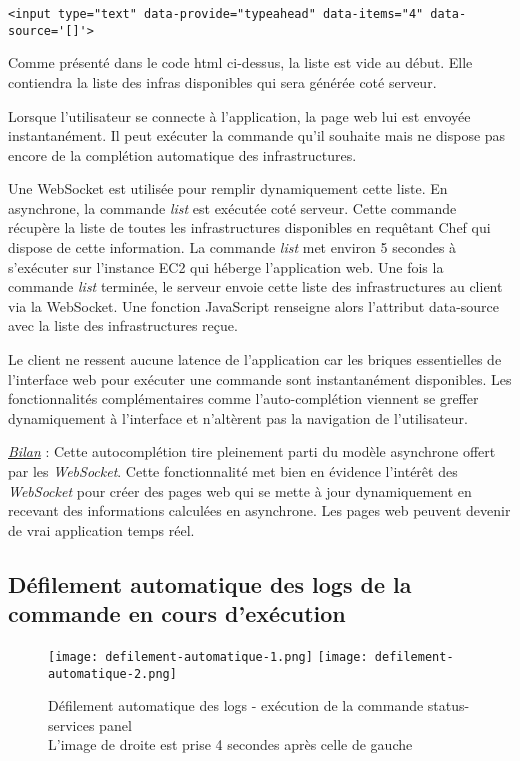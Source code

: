 \lstset{language=XML}
\begin{lstlisting}[caption=utilisation de bootstrap-typeahead]
  <input type="text" data-provide="typeahead" data-items="4" data-source='[]'>
\end{lstlisting}

Comme présenté dans le code html ci-dessus, la liste est vide au début.
Elle contiendra la liste des infras disponibles qui sera générée coté serveur.

Lorsque l'utilisateur se connecte à l'application, la page web lui est envoyée
instantanément. Il peut exécuter la commande qu'il souhaite mais ne
dispose pas encore de la complétion automatique des infrastructures.

Une WebSocket est utilisée pour remplir dynamiquement cette liste.
En asynchrone, la commande \textit{list} est exécutée coté serveur.
Cette commande récupère la liste de toutes les infrastructures disponibles en
requêtant Chef qui dispose de cette information. La commande \textit{list} met
environ 5 secondes à s'exécuter sur l'instance EC2 qui héberge l'application
web.
Une fois la commande \textit{list} terminée, le serveur envoie cette liste des
infrastructures au client via la WebSocket.
Une fonction JavaScript renseigne alors l'attribut data-source avec
la liste des infrastructures reçue.

Le client ne ressent aucune latence de l'application car les briques essentielles
de l'interface web pour exécuter une commande sont instantanément disponibles.
Les fonctionnalités complémentaires comme l'auto-complétion viennent se greffer
dynamiquement à l'interface et n'altèrent pas la navigation de l'utilisateur.

\underline{\textit{Bilan}} : Cette autocomplétion tire pleinement parti du
modèle asynchrone offert par les \textit{WebSocket}. Cette fonctionnalité met
bien en évidence l'intérêt des \textit{WebSocket} pour créer des pages web qui
se mette à jour dynamiquement en recevant des informations calculées en
asynchrone. Les pages web peuvent devenir de vrai application temps réel.

\subsection{Défilement automatique des logs de la commande en cours d'exécution}

\begin{figure}[H]
  \texttt{[image: defilement-automatique-1.png]}
  \texttt{[image: defilement-automatique-2.png]}
  \caption{Défilement automatique des logs - exécution de la commande
    status-services panel\\L'image de droite est prise 4 secondes après celle de gauche}
\end{figure}

